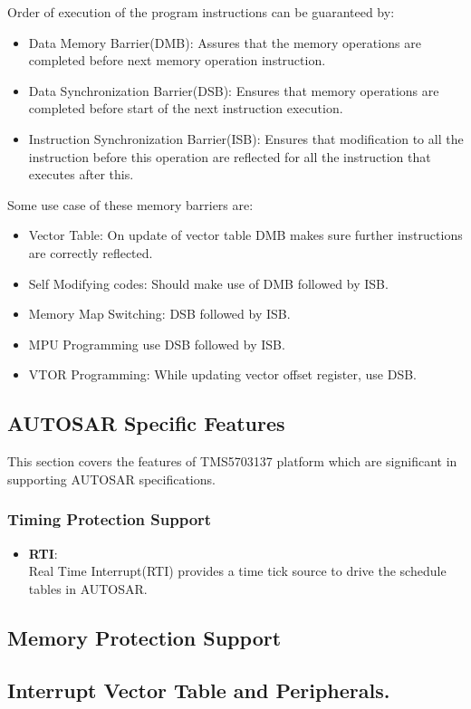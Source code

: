 Order of execution of the program instructions can be guaranteed by:
\begin{itemize}
	\item Data Memory Barrier(DMB): Assures that the memory operations are completed before next memory operation instruction.
	\item Data Synchronization Barrier(DSB): Ensures that memory operations are completed before start of the next instruction execution.
	\item Instruction Synchronization Barrier(ISB): Ensures that modification to all the instruction before this operation are reflected for all the instruction that executes after this. 
\end{itemize}
Some use case of these memory barriers are:
\begin{itemize}
	\item Vector Table: On update of vector table DMB makes sure further instructions are correctly reflected.
	\item Self Modifying codes: Should make use of DMB followed by ISB.
	\item Memory Map Switching: DSB followed by ISB.
	\item MPU Programming use DSB followed by ISB.
	\item VTOR Programming: While updating vector offset register, use DSB.
\end{itemize}


\subsection{AUTOSAR Specific Features}
This section covers the features of TMS5703137 platform which are significant in supporting AUTOSAR specifications.
\subsubsection{Timing Protection Support}
\begin{itemize}
	\item \textbf{RTI}:\\ Real Time Interrupt(RTI) provides a time tick source to drive the schedule tables in AUTOSAR. 
\end{itemize}
\subsection{Memory Protection Support}
\subsection{Interrupt Vector Table and Peripherals.}